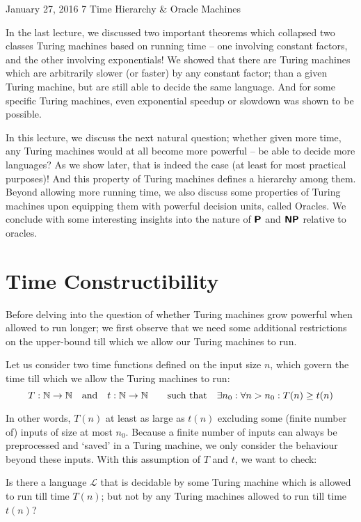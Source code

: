 \documentclass[usletter]{article}
\newcommand {\namedset}[1]     {\ensuremath{\mathbb{#1}}}
\newcommand {\langset}[1]      {\ensuremath{\mathcal{#1}}}
\newcommand {\family}[1]       {\ensuremath{\textnormal{\textsf{\textbf{#1}}}}}
\newcommand {\term}[1]      {\textsf{#1}}
\begin{document}
 {January 27, 2016}
            {7}
            {Time Hierarchy \& Oracle Machines}

\noindent
In the last lecture, we discussed two important theorems which collapsed two
classes Turing machines based on running time -- one involving constant factors,
and the other involving exponentials! We showed that there are Turing machines
which are arbitrarily slower (or faster) by any constant factor; than a given
Turing machine, but are still able to decide the same language. And for some
specific Turing machines, even exponential speedup or slowdown was shown to be
possible.

In this lecture, we discuss the next natural question; whether given more time,
any Turing machines would at all become more powerful -- be able to decide more
languages? As we show later, that is indeed the case (at least for most
practical purposes)! And this property of Turing machines defines a hierarchy
among them. Beyond allowing more running time, we also discuss some properties
of Turing machines upon equipping them with powerful decision units, called
\term{Oracles}. We conclude with some interesting insights into the nature of
\family{P} and \family{NP} relative to oracles.

\section{Time Constructibility}

Before delving into the question of whether Turing machines grow powerful when
allowed to run longer; we first observe that we need some additional
restrictions on the upper-bound till which we allow our Turing machines to run.

Let us consider two time functions defined on the input size $n$, which govern
the time till which we allow the Turing machines to run:
$$ T: \namedset{N} \to \namedset{N} \quad\textnormal{and}\quad
   t: \namedset{N} \to \namedset{N} \qquad\textnormal{such that}\quad
   \exists n_0: \forall n > n_0: T(n) \geq t(n)$$

\noindent
In other words, $T(n)$ at least as large as $t(n)$ excluding some (finite number
of) inputs of size at most $n_0$. Because a finite number of inputs can always
be preprocessed and `saved' in a Turing machine, we only consider the behaviour
beyond these inputs. With this assumption of $T$ and $t$, we want to check:

\begin{center}
Is there a language \langset{L} that is decidable by some Turing machine which
is allowed to run till time $T(n)$; but not by any Turing machines allowed to
run till time $t(n)$?
\end{center}
\end{document}
